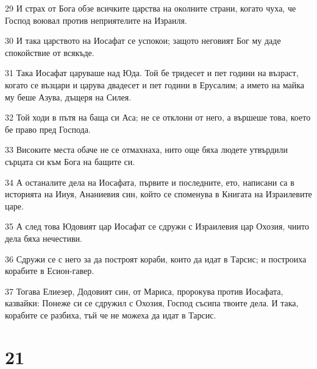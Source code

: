 \par 29 И страх от Бога обзе всичките царства на околните страни, когато чуха, че Господ воювал против неприятелите на Израиля.
\par 30 И така царството на Иосафат се успокои; защото неговият Бог му даде спокойствие от всякъде.
\par 31 Така Иосафат царуваше над Юда. Той бе тридесет и пет години на възраст, когато се възцари и царува двадесет и пет години в Ерусалим; а името на майка му беше Азува, дъщеря на Силея.
\par 32 Той ходи в пътя на баща си Аса; не се отклони от него, а вършеше това, което бе право пред Господа.
\par 33 Високите места обаче не се отмахнаха, нито още бяха людете утвърдили сърцата си към Бога на бащите си.
\par 34 А останалите дела на Иосафата, първите и последните, ето, написани са в историята на Ииуя, Ананиевия син, който се споменува в Книгата на Израилевите царе.
\par 35 А след това Юдовият цар Иосафат се сдружи с Израилевия цар Охозия, чиито дела бяха нечестиви.
\par 36 Сдружи се с него за да построят кораби, които да идат в Тарсис; и построиха корабите в Есион-гавер.
\par 37 Тогава Елиезер, Додовият син, от Мариса, пророкува против Иосафата, казвайки: Понеже си се сдружил с Охозия, Господ съсипа твоите дела. И така, корабите се разбиха, тъй че не можеха да идат в Тарсис.

\chapter{21}

